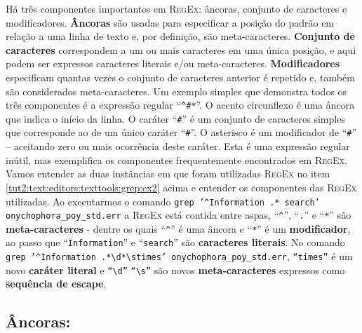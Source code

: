 \begin{refsection}
Há três componentes importantes em \textsc{RegEx}: âncoras, conjunto de caracteres e modificadores. \textbf{Âncoras} são usadas para especificar a posição do padrão em relação a uma linha de texto e, por definição, são meta-caracteres. \textbf{Conjunto de caracteres} correspondem a um ou mais caracteres em uma única posição, e aqui podem ser expressos caracteres literais e/ou meta-caracteres. \textbf{Modificadores} especificam quantas vezes o conjunto de caracteres anterior é repetido e, também são considerados meta-caracteres. Um exemplo simples que demonstra todos os três componentes é a expressão regular ``\texttt{\^{}\#*}''. O acento circunflexo é uma âncora que indica o início da linha. O caráter ``\texttt{\#}'' é um conjunto de caracteres simples que corresponde ao de um único caráter ``\texttt{\#}''. O asterisco é um modificador de ``\texttt{\#}'' -- aceitando zero ou mais ocorrência deste caráter. Esta é uma expressão regular inútil, mas exemplifica os componentes frequentemente encontrados em \textsc{RegEx}.\\

Vamos entender as duas instâncias em que foram utilizadas \textsc{RegEx} no item \ref{tut2:text:editors:texttools:grep:ex2} acima e entender os componentes das \textsc{RegEx} utilizadas. Ao executarmos o comando  \texttt{grep '\^{}Information .* search' onychophora\_poy\_std.err} a \textsc{RegEx} está contida entre aspas, ``\texttt{\^{}}'', ``\texttt{.}'' e ``\texttt{*}'' são \textbf{meta-caracteres} - dentre os quais ``\texttt{\^{}}'' é uma âncora e ``\texttt{*}'' é um \textbf{modificador}, ao passo que ``\texttt{Information}'' e ``\texttt{search}'' são \textbf{caracteres literais}. No comando \texttt{grep '\^{}Information .*\textbackslash d*\textbackslash stimes' onychophora\_poy\_std.err}, \texttt{``times''} é um novo \textbf{caráter literal} e \texttt{``\textbackslash d''} \texttt{``\textbackslash s''} são novos \textbf{meta-caracteres} expressos como \textbf{sequência de escape}.\\

\subsection{Âncoras:}\label{tut2:regex:anchor}


\end{refsection}
